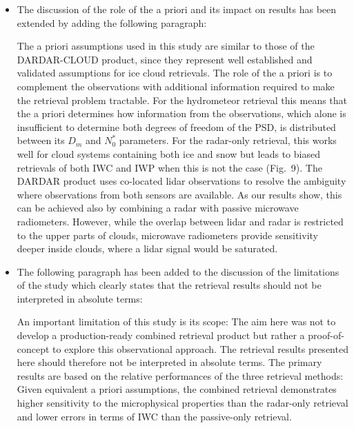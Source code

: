 \documentclass[11pt]{scrartcl}
\begin{document}
\begin{itemize}
\item The discussion of the role of the a priori and its impact on results has
  been extended by adding the following paragraph:

  \begin{mdframed}[style=change]
  The a priori assumptions used in this study are similar to those of the
  DARDAR-CLOUD product, since they represent well established and validated
  assumptions for ice cloud retrievals. The role of the a priori is to complement
  the observations with additional information required to make the retrieval
  problem tractable. For the hydrometeor retrieval this means that the a priori
  determines how information from the observations, which alone is insufficient to
  determine both degrees of freedom of the PSD, is distributed between its $D_m$
  and $N_0^*$ parameters. For the radar-only retrieval, this works well for cloud
  systems containing both ice and snow but leads to biased retrievals of both IWC
  and IWP when this is not the case (Fig.~9). The DARDAR product
  uses co-located lidar observations to resolve the ambiguity where observations
  from both sensors are available. As our results show, this can be achieved also
  by combining a radar with passive microwave radiometers. However, while the
  overlap between lidar and radar is restricted to the upper parts of clouds,
  microwave radiometers provide sensitivity deeper inside clouds, where a lidar
  signal would be saturated.
  \end{mdframed}

\item The following paragraph has been added to the discussion of the limitations of
  the study which clearly states that the retrieval results should not be
  interpreted in absolute terms:

  \begin{mdframed}[style=change]
  An important limitation of this study is its scope: The aim here was not to
  develop a production-ready combined retrieval product but rather a
  proof-of-concept to explore this observational approach. The retrieval results
  presented here should therefore not be interpreted in absolute terms. The
  primary results are based on the relative performances of the three retrieval
  methods: Given equivalent a priori assumptions, the combined retrieval
  demonstrates higher sensitivity to the microphysical properties than the
  radar-only retrieval and lower errors in terms of IWC than the passive-only
  retrieval.
  \end{mdframed}


\end{itemize}
\end{document}
